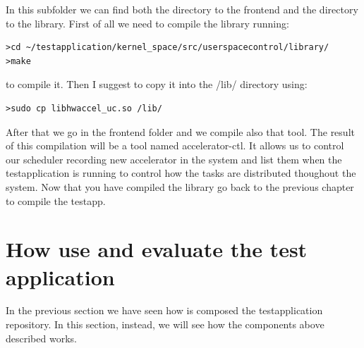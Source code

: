 \documentclass[a4paper,13pt]{article}
\begin{document}
\begin{multicols}{2}
\begin{itemize}
    \end{itemize}
    \vspace{-2ex}
        In this subfolder we can find both the directory to the frontend and the directory to the library. First of 
        all we need to compile the library running:
\begin{lstlisting}
>cd ~/testapplication/kernel_space/src/userspacecontrol/library/
>make
\end{lstlisting}
        to compile it. Then I suggest to copy it into the /lib/ directory using:
\begin{lstlisting}
>sudo cp libhwaccel_uc.so /lib/
\end{lstlisting}
        After that we go in the frontend folder and we compile also that tool.
        The result of this compilation will be a tool named accelerator-ctl. It allows us to control our scheduler
        recording new accelerator in the system and list them when the testapplication is running to control
        how the tasks are distributed thoughout the system.
        Now that you have compiled the library go back to the previous chapter to compile the testapp.

\section{How use and evaluate the test application}
        In the previous section we have seen how is composed the testapplication repository. In this section, instead, 
        we will see how the components above described works. 

\end{multicols}
\end{document}
